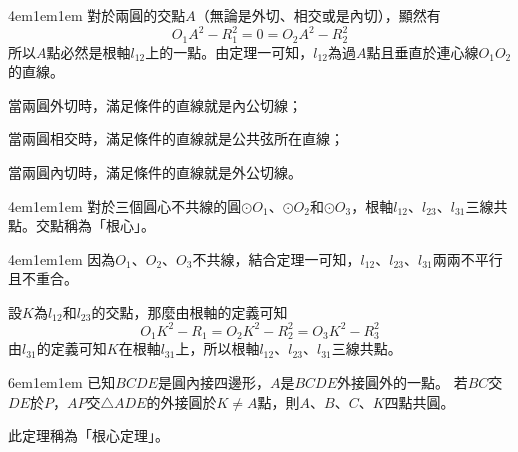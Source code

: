 \documentclass[12pt]{article}
\begin{document}
\begin{mybox}[證明]{4em}{1em}{1em}
    對於兩圓的交點$A$（無論是外切、相交或是內切），顯然有
    $$
        O_1A^2-R_1^2=0=O_2A^2-R_2^2
    $$
    所以$A$點必然是根軸$l_{12}$上的一點。由定理一可知，$l_{12}$為過$A$點且垂直於連心線$O_1O_2$的直線。

    當兩圓外切時，滿足條件的直線就是內公切線；

    當兩圓相交時，滿足條件的直線就是公共弦所在直線；

    當兩圓內切時，滿足條件的直線就是外公切線。
\end{mybox}
\begin{mybox}[定理3]{4em}{1em}{1em}
    對於三個圓心不共線的圓$\odot{O_1}$、$\odot{O_2}$和$\odot{O_3}$，根軸$l_{12}$、$l_{23}$、$l_{31}$三線共點。交點稱為「根心」。
\end{mybox}
\begin{mybox}[證明]{4em}{1em}{1em}
    因為$O_1$、$O_2$、$O_3$不共線，結合定理一可知，$l_{12}$、$l_{23}$、$l_{31}$兩兩不平行且不重合。

    設$K$為$l_{12}$和$l_{23}$的交點，那麼由根軸的定義可知
    $$
        O_1K^2-R_1=O_2K^2-R_2^2=O_3K^2-R_3^2
    $$
    由$l_{31}$的定義可知$K$在根軸$l_{31}$上，所以根軸$l_{12}$、$l_{23}$、$l_{31}$三線共點。
\end{mybox}
\begin{mybox}[例題\thesection-1]{6em}{1em}{1em}
    已知$BCDE$是圓內接四邊形，$A$是$BCDE$外接圓外的一點。
    若$BC$交$DE$於$P$，$AP$交$\triangle{ADE}$的外接圓於$K\neq A$點，則$A$、$B$、$C$、$K$四點共圓。

    此定理稱為「根心定理」。
\end{mybox}
\end{document}
